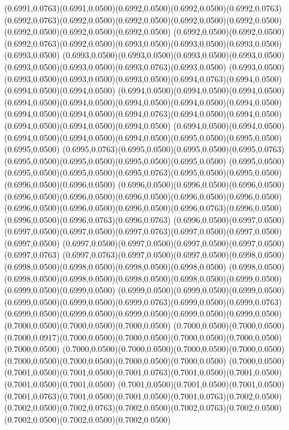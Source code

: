 (0.6991,0.0763)(0.6991,0.0500)(0.6992,0.0500)(0.6992,0.0500)(0.6992,0.0763)
\PST@Solid(0.6992,0.0763)(0.6992,0.0500)(0.6992,0.0500)(0.6992,0.0500)(0.6992,0.0500)(0.6992,0.0500)(0.6992,0.0500)(0.6992,0.0500)
(0.6992,0.0500)(0.6992,0.0500)(0.6992,0.0763)(0.6992,0.0500)(0.6993,0.0500)(0.6993,0.0500)(0.6993,0.0500)(0.6993,0.0500)
(0.6993,0.0500)(0.6993,0.0500)(0.6993,0.0500)(0.6993,0.0500)(0.6993,0.0500)(0.6993,0.0500)(0.6993,0.0763)(0.6993,0.0500)
(0.6993,0.0500)(0.6993,0.0500)(0.6993,0.0500)(0.6993,0.0500)(0.6994,0.0763)(0.6994,0.0500)(0.6994,0.0500)(0.6994,0.0500)
(0.6994,0.0500)(0.6994,0.0500)(0.6994,0.0500)(0.6994,0.0500)(0.6994,0.0500)(0.6994,0.0500)(0.6994,0.0500)(0.6994,0.0500)
(0.6994,0.0500)(0.6994,0.0500)(0.6994,0.0763)(0.6994,0.0500)(0.6994,0.0500)(0.6994,0.0500)(0.6994,0.0500)(0.6994,0.0500)
(0.6994,0.0500)(0.6994,0.0500)(0.6994,0.0500)(0.6994,0.0500)(0.6994,0.0500)(0.6995,0.0500)(0.6995,0.0500)(0.6995,0.0500)
(0.6995,0.0763)(0.6995,0.0500)(0.6995,0.0500)(0.6995,0.0763)(0.6995,0.0500)(0.6995,0.0500)(0.6995,0.0500)(0.6995,0.0500)
(0.6995,0.0500)(0.6995,0.0500)(0.6995,0.0500)(0.6995,0.0763)(0.6995,0.0500)(0.6995,0.0500)(0.6996,0.0500)(0.6996,0.0500)
(0.6996,0.0500)(0.6996,0.0500)(0.6996,0.0500)(0.6996,0.0500)(0.6996,0.0500)(0.6996,0.0500)(0.6996,0.0500)(0.6996,0.0500)
(0.6996,0.0500)(0.6996,0.0500)(0.6996,0.0500)(0.6996,0.0763)(0.6996,0.0500)(0.6996,0.0500)(0.6996,0.0763)(0.6996,0.0763)
(0.6996,0.0500)(0.6997,0.0500)(0.6997,0.0500)(0.6997,0.0500)(0.6997,0.0763)(0.6997,0.0500)(0.6997,0.0500)(0.6997,0.0500)
(0.6997,0.0500)(0.6997,0.0500)(0.6997,0.0500)(0.6997,0.0500)(0.6997,0.0763)
\PST@Solid(0.6997,0.0763)(0.6997,0.0500)(0.6997,0.0500)(0.6998,0.0500)(0.6998,0.0500)(0.6998,0.0500)(0.6998,0.0500)(0.6998,0.0500)
(0.6998,0.0500)(0.6998,0.0500)(0.6998,0.0500)(0.6998,0.0500)(0.6998,0.0500)(0.6999,0.0500)(0.6999,0.0500)(0.6999,0.0500)
(0.6999,0.0500)(0.6999,0.0500)(0.6999,0.0500)(0.6999,0.0500)(0.6999,0.0500)(0.6999,0.0763)(0.6999,0.0500)(0.6999,0.0763)
(0.6999,0.0500)(0.6999,0.0500)(0.6999,0.0500)(0.6999,0.0500)(0.6999,0.0500)(0.7000,0.0500)(0.7000,0.0500)(0.7000,0.0500)
(0.7000,0.0500)(0.7000,0.0500)(0.7000,0.0917)(0.7000,0.0500)(0.7000,0.0500)(0.7000,0.0500)(0.7000,0.0500)(0.7000,0.0500)
(0.7000,0.0500)(0.7000,0.0500)(0.7000,0.0500)(0.7000,0.0500)(0.7000,0.0500)(0.7000,0.0500)(0.7000,0.0500)(0.7000,0.0500)
(0.7000,0.0500)(0.7001,0.0500)(0.7001,0.0500)(0.7001,0.0763)(0.7001,0.0500)(0.7001,0.0500)(0.7001,0.0500)(0.7001,0.0500)
(0.7001,0.0500)(0.7001,0.0500)(0.7001,0.0500)(0.7001,0.0763)(0.7001,0.0500)(0.7001,0.0500)(0.7001,0.0763)(0.7002,0.0500)
(0.7002,0.0500)(0.7002,0.0763)(0.7002,0.0500)(0.7002,0.0763)(0.7002,0.0500)(0.7002,0.0500)(0.7002,0.0500)(0.7002,0.0500)
